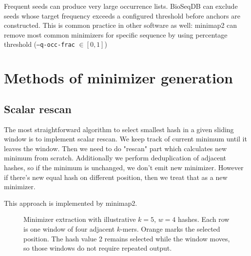 Frequent seeds can produce very large occurrence lists. BioSeqDB can exclude
seeds whose target frequency exceeds a configured threshold before anchors
are constructed. This is common practice in other software as well: minimap2 can remove most common minimizers for specific sequence by using percentage threshold (\texttt{--q-occ-frac} \(\in[0,1]\))

\section{Methods of minimizer generation}

\subsection{Scalar rescan}

The most straightforward algorithm to select smallest hash in a given sliding window is to implement scalar rescan. We keep track of current minimum until it leaves the window. Then we need to do "rescan" part which calculates new minimum from scratch.
Additionally we perform deduplication of adjacent hashes, so if the minimum is unchanged, we don't emit new minimizer. However if there's new equal hash on different position, then we treat that as a new minimizer.

This approach is implemented by minimap2.

\begin{figure}[H]
\centering
{}
\caption{Minimizer extraction with illustrative $k=5$, $w=4$ hashes.  Each
row is one window of four adjacent $k$-mers. Orange marks the selected
position.  The hash value 2 remains selected while the window moves, so those
windows do not require repeated output.}
\label{fig:rewrite-minimap-walkthrough}
\end{figure}

